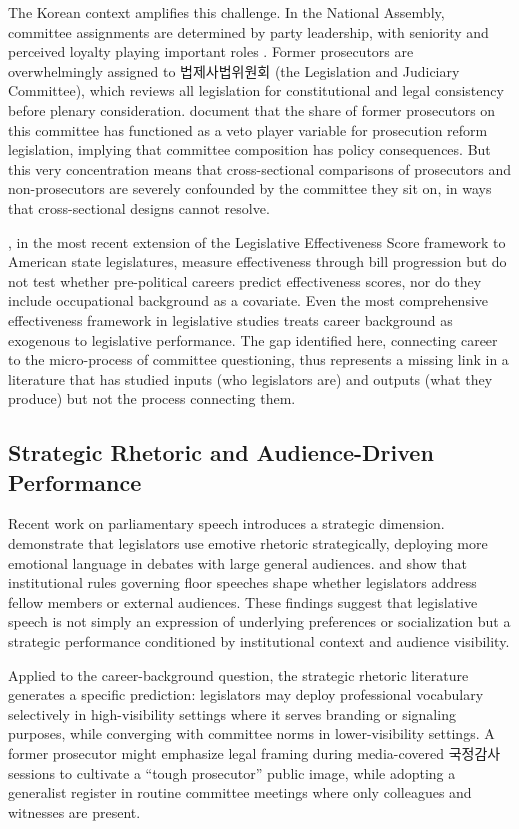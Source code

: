 \documentclass[11pt]{article}
\begin{document}
The Korean context amplifies this challenge. In the National Assembly, committee assignments are determined by party leadership, with seniority and perceived loyalty playing important roles \citep{kang2023}. Former prosecutors are overwhelmingly assigned to 법제사법위원회 (the Legislation and Judiciary Committee), which reviews all legislation for constitutional and legal consistency before plenary consideration. \citet{park2025} document that the share of former prosecutors on this committee has functioned as a veto player variable for prosecution reform legislation, implying that committee composition has policy consequences. But this very concentration means that cross-sectional comparisons of prosecutors and non-prosecutors are severely confounded by the committee they sit on, in ways that cross-sectional designs cannot resolve.

\citet{bucchianeri2024}, in the most recent extension of the Legislative Effectiveness Score framework to American state legislatures, measure effectiveness through bill progression but do not test whether pre-political careers predict effectiveness scores, nor do they include occupational background as a covariate. Even the most comprehensive effectiveness framework in legislative studies treats career background as exogenous to legislative performance. The gap identified here, connecting career to the micro-process of committee questioning, thus represents a missing link in a literature that has studied inputs (who legislators are) and outputs (what they produce) but not the process connecting them.

\subsection{Strategic Rhetoric and Audience-Driven Performance}

Recent work on parliamentary speech introduces a strategic dimension. \citet{osnabrugge2021} demonstrate that legislators use emotive rhetoric strategically, deploying more emotional language in debates with large general audiences. \citet{proksch2012} and \citet{proksch2015} show that institutional rules governing floor speeches shape whether legislators address fellow members or external audiences. These findings suggest that legislative speech is not simply an expression of underlying preferences or socialization but a strategic performance conditioned by institutional context and audience visibility.

Applied to the career-background question, the strategic rhetoric literature generates a specific prediction: legislators may deploy professional vocabulary selectively in high-visibility settings where it serves branding or signaling purposes, while converging with committee norms in lower-visibility settings. A former prosecutor might emphasize legal framing during media-covered 국정감사 sessions to cultivate a ``tough prosecutor'' public image, while adopting a generalist register in routine committee meetings where only colleagues and witnesses are present.
\end{document}
